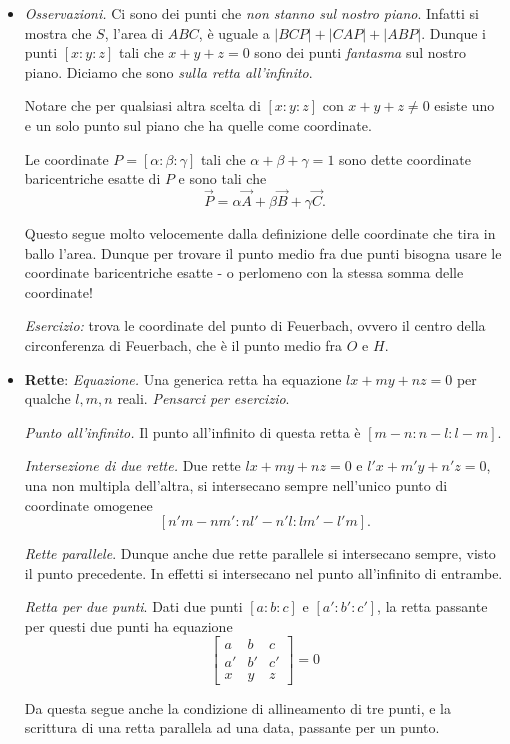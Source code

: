 \begin{itemize}
	\item \emph{Osservazioni.} Ci sono dei punti che \emph{non stanno sul nostro piano}. Infatti si mostra che $S$, l'area di $ABC$, è uguale a $|BCP|+|CAP|+|ABP|$. Dunque i punti $[x:y:z]$ tali che $x+y+z=0$ sono dei punti \emph{fantasma} sul nostro piano. Diciamo che sono \emph{sulla retta all'infinito}.
	
	Notare che per qualsiasi altra scelta di $[x:y:z]$ con $x+y+z\neq 0$ esiste uno e un solo punto sul piano che ha quelle come coordinate.
	
	Le coordinate $P=[\alpha:\beta:\gamma]$ tali che $\alpha+\beta+\gamma=1$ sono dette coordinate baricentriche esatte di $P$ e sono tali che
	$$
	\vec{P}=\alpha\vec{A}+\beta\vec{B}+\gamma\vec{C}.
	$$
	
	Questo segue molto velocemente dalla definizione delle coordinate che tira in ballo l'area. Dunque per trovare il punto medio fra due punti bisogna usare le coordinate baricentriche esatte - o perlomeno con la stessa somma delle coordinate!
	
	\emph{Esercizio:} trova le coordinate del punto di Feuerbach, ovvero il centro della circonferenza di Feuerbach, che è il punto medio fra $O$ e $H$.
	
	\item \textbf{Rette}: 
	\emph{Equazione.} Una generica retta ha equazione $lx+my+nz=0$ per qualche $l,m,n$ reali. \emph{Pensarci per esercizio}.
	
	\emph{Punto all'infinito.} Il punto all'infinito di questa retta è $[m-n:n-l:l-m]$. 
	
	\emph{Intersezione di due rette.} Due rette $lx+my+nz=0$ e $l'x+m'y+n'z=0$, una non multipla dell'altra, si intersecano sempre nell'unico punto di coordinate omogenee
	$$
	\left[n'm-nm':nl'-n'l:lm'-l'm\right].
	$$
	
	\emph{Rette parallele}. Dunque anche due rette parallele si intersecano sempre, visto il punto precedente. In effetti si intersecano nel punto all'infinito di entrambe.
	
	\emph{Retta per due punti}. Dati due punti $[a:b:c]$ e $[a':b':c']$, la retta passante per questi due punti ha equazione 
	$$
	\begin{bmatrix}
		a & b & c \\
		a' & b' & c' \\
		x & y & z
	\end{bmatrix}
	=0
	$$
	
	Da questa segue anche la condizione di allineamento di tre punti, e la scrittura di una retta parallela ad una data, passante per un punto.
	

\end{itemize}
